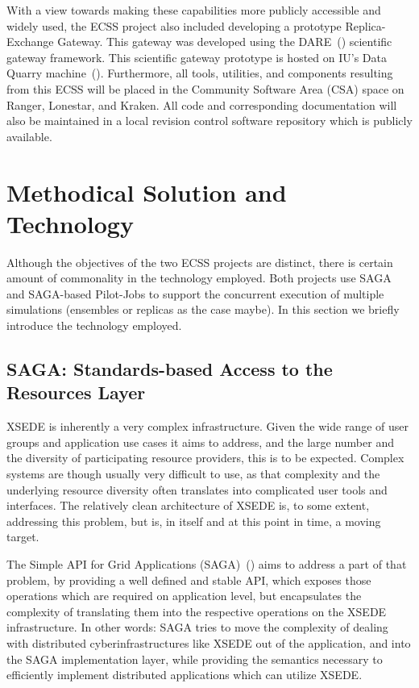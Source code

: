 \documentclass{sig-alternate}
\begin{document}
With a view towards making these capabilities more publicly accessible and
widely used, the ECSS project also included developing a prototype
Replica-Exchange Gateway. This gateway was developed using the
DARE~(\cite{DARE})
scientific gateway framework. This scientific gateway prototype is hosted
on IU's Data Quarry machine~(\cite{DataQuarry}). Furthermore, all tools,
utilities, and components resulting from this ECSS will be placed in the Community 
Software Area (CSA) space on Ranger,
Lonestar, and Kraken. All code and corresponding documentation will also be
maintained in a local revision control software repository which is publicly
available.


\section{Methodical Solution and Technology}

Although the objectives of the two ECSS projects are distinct, there
is certain amount of commonality in the technology employed. Both
projects use SAGA and SAGA-based Pilot-Jobs to support the concurrent
execution of multiple simulations (ensembles or replicas as the case
maybe). In this section we briefly introduce the technology employed.

\subsection{SAGA: Standards-based Access to the Resources Layer}

XSEDE is inherently a very complex infrastructure.  Given the wide
range of user groups and application use cases it aims to address,
and the large number and the diversity of participating resource
providers, this is to be expected.  Complex systems are though
usually very difficult to use, as that complexity and the underlying
resource diversity often translates into complicated user tools and
interfaces.  The relatively clean architecture of XSEDE is, to some
extent, addressing this problem, but is, in itself and at this point
in time, a moving target.

The Simple API for Grid Applications (SAGA)~(\cite{saga_url}) aims to address a
part of that problem, by providing a well defined and stable API, which
exposes those operations which are required on application level, but
encapsulates the complexity of translating them into the respective
operations on the XSEDE infrastructure.  In other words: SAGA tries
to move the complexity of dealing with distributed
cyberinfrastructures like XSEDE out of the application, and into the
SAGA implementation layer, while providing the semantics necessary to
efficiently implement distributed applications which can utilize
XSEDE.
\end{document}
